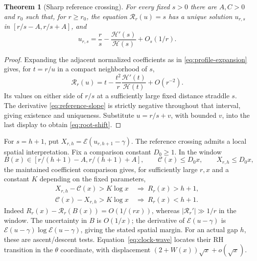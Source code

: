 \documentclass[11pt]{article}
\newtheorem{theorem}{Theorem}[section]
\theoremstyle{definition}
\newcommand{\EE}{\mathcal E}
\begin{document}
\begin{theorem}[Sharp reference crossing]\label{thm:root-shift}
For every fixed $s>0$ there are $A,C>0$ and $r_0$ such that, for
$r\ge r_0$, the equation $\mathcal R_r(u)=s$ has a unique solution
$u_{r,s}$ in $[r/s-A,r/s+A]$, and
\begin{equation}\label{eq:root-shift}
 u_{r,s}=\frac r s-\frac{\mathcal H'(s)}{\mathcal H(s)}
                         +O_s(1/r).
\end{equation}
\end{theorem}
\begin{proof}
Expanding the adjacent normalized coefficients as in
\eqref{eq:profile-expansion} gives, for $t=r/u$ in a compact
neighborhood of $s$,
\[
 \mathcal R_r(u)
 =t-\frac{t^2}{r}\frac{\mathcal H'(t)}{\mathcal H(t)}
       +O(r^{-2}).
\]
Its values on either side of $r/s$ at a sufficiently large fixed
distance straddle $s$. The derivative \eqref{eq:reference-slope}
is strictly negative throughout that interval, giving existence
and uniqueness. Substitute $u=r/s+v$, with bounded $v$, into the
last display to obtain \eqref{eq:root-shift}.
\end{proof}

For $s=h+1$, put $X_{r,h}=\EE(u_{r,h+1}-\gamma)$.
The reference crossing admits a local spatial interpretation.
Fix a comparison constant $D_0\ge1$. In the window
\[
 B(x)\in[r/(h+1)-A,r/(h+1)+A],\qquad
 \mathcal C(x)\le D_0x,\qquad X_{r,h}\le D_0x,
\]
the maintained coefficient comparison gives, for sufficiently large
$r,x$ and a constant $K$ depending on the fixed parameters,
\begin{equation}\label{eq:local-spatial}
\begin{split}
 X_{r,h}-\mathcal C(x)>K\log x&\ \Longrightarrow\ R_r(x)>h+1,\\
 \mathcal C(x)-X_{r,h}>K\log x&\ \Longrightarrow\ R_r(x)<h+1.
\end{split}
\end{equation}
Indeed $R_r(x)-\mathcal R_r(B(x))=O(1/(rx))$, whereas
$|\mathcal R_r'|\gg1/r$ in the window. The uncertainty in $B$
is $O(1/x)$; the derivative of $\EE(u-\gamma)$ is
$\EE(u-\gamma)\log\EE(u-\gamma)$, giving the stated spatial margin.
For an actual gap $h$, these are ascent/descent tests.
Equation~\eqref{eq:clock-wave} locates their RH transition in the
$\theta$ coordinate, with displacement $(2+W(x))\sqrt{x}+o(\sqrt{x})$.
\end{document}
